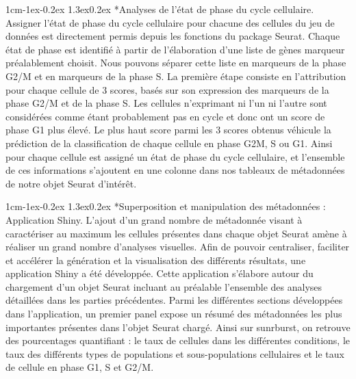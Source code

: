 \documentclass[12pt]{report}
\makeatletter
\renewcommand\subsubsection{\@startsection{subsubsection}{3}{\z@}%
	{1cm\@plus -1ex\@minus -0.2ex}%
	{1.3ex\@plus 0.2ex}%
	{\reset@font\normalsize\bf}}
\makeatother
\begin{document}
\subsubsection*{Analyses de l'état de phase du cycle cellulaire.}
Assigner l'état de phase du cycle cellulaire pour chacune des cellules du jeu de données est directement permis depuis les fonctions du package Seurat. Chaque état de phase est identifié à partir de l'élaboration d'une liste de gènes marqueur préalablement choisit\cite{Tirosh}.
Nous pouvons séparer cette liste en marqueurs de la phase G2/M et en marqueurs de la phase S. La première étape consiste en l'attribution pour chaque cellule de 3 scores, basés sur son expression des marqueurs de la phase G2/M et de la phase S.
Les cellules n'exprimant ni l'un ni l'autre sont considérées comme étant probablement pas en cycle et donc ont un score de phase G1 plus élevé. Le plus haut score parmi les 3 scores obtenus véhicule la prédiction de la classification de chaque cellule en phase G2M, S ou G1\cite{Tirosh}.
Ainsi pour chaque cellule est assigné un état de phase du cycle cellulaire, et l'ensemble de ces informations s'ajoutent en une colonne dans nos tableaux de métadonnées de notre objet Seurat d'intérêt.


\subsubsection*{Superposition et manipulation des métadonnées : Application Shiny.}
L'ajout d'un grand nombre de métadonnée visant à caractériser au maximum les cellules présentes dans chaque objet Seurat amène à réaliser un grand nombre d'analyses visuelles. 
Afin de pouvoir centraliser, faciliter et accélérer la génération et la visualisation des différents résultats, une application Shiny a été développée.
Cette application s'élabore autour du chargement d'un objet Seurat incluant au préalable l'ensemble des analyses détaillées dans les parties précédentes.
Parmi les différentes sections développées dans l'application, un premier panel expose un résumé des métadonnées les plus importantes présentes dans l'objet Seurat chargé. Ainsi sur sunrburst, on retrouve des pourcentages quantifiant : 
le taux de cellules dans les différentes conditions, le taux des différents types de populations et sous-populations cellulaires et le taux de cellule en phase G1, S et G2/M. 
\end{document}
